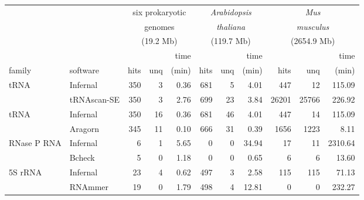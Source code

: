 \begin{small}
\begin{table}
\begin{center}
\begin{tabular}{|l|l|rrr|rrr|rrr|} \cline{3-11}
\multicolumn{1}{c}{}  &  \multicolumn{1}{c|}{}  &  \multicolumn{3}{c|}{six prokaryotic}  &  \multicolumn{3}{c|}{\emph{Arabidopsis}}&  \multicolumn{3}{c|}{\emph{Mus}} \\
\multicolumn{1}{c}{}  &  \multicolumn{1}{c|}{}  &  \multicolumn{3}{c|}{genomes}        &  \multicolumn{3}{c|}{\emph{thaliana}}   &  \multicolumn{3}{c|}{\emph{musculus}}   \\ 
\multicolumn{1}{c}{}  &  \multicolumn{1}{c|}{}  &  \multicolumn{3}{c|}{(19.2 Mb)}  &  \multicolumn{3}{c|}{(119.7 Mb)}  &  \multicolumn{3}{c|}{(2654.9 Mb)}   \\ \cline{3-11}
\multicolumn{1}{c}{}  &  \multicolumn{1}{c|}{}  &      &     &    time &       &      &    time &      &     &    time  \\ 
\multicolumn{1}{l}{family} &  \multicolumn{1}{l|}{software}  &  hits & unq &   (min) &  hits & unq &   (min) &  hits & unq &   (min)  \\ \hline 
tRNA                       &  Infernal                   &  350 &   3 &    0.36 &  681 &   5 &    4.01 &  447 &  12 &  115.09  \\ 
                           &  tRNAscan-SE                &  350 &   3 &    2.76 &  699 &  23 &    3.84 &  26201 & 25766 &  226.92  \\ \hline 
tRNA                       &  Infernal                   &  350 &  16 &    0.36 &  681 &  46 &    4.01 &  447 &  14 &  115.09  \\ 
                           &  Aragorn                    &  345 &  11 &    0.10 &  666 &  31 &    0.39 &  1656 & 1223 &    8.11  \\ \hline 
RNase P RNA                &  Infernal                   &    6 &   1 &    5.65 &    0 &   0 &   34.94 &   17 &  11 & 2310.64  \\ 
                           &  Bcheck                     &    5 &   0 &    1.18 &    0 &   0 &    0.65 &    6 &   6 &   13.60  \\ \hline 
5S rRNA                    &  Infernal                   &   23 &   4 &    0.62 &  497 &   3 &    2.58 &  115 & 115 &   71.13  \\ 
                           &  RNAmmer                    &   19 &   0 &    1.79 &  498 &   4 &   12.81 &    0 &   0 &  232.27  \\ \hline 

\end{tabular}
\end{center}
\end{table}
\end{small}
